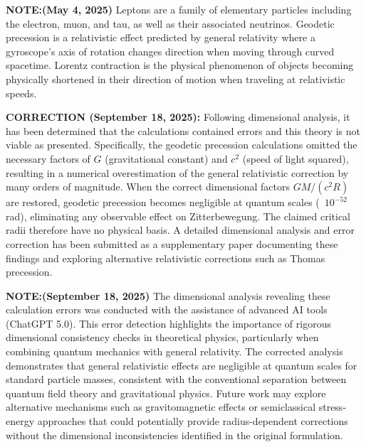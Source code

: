 \documentclass[12pt,letterpaper]{article} %
\begin{document}
\vspace{0.5cm}
\noindent\textbf{NOTE:(May 4, 2025)} Leptons are a family of elementary particles including the electron, muon, and tau, as well as their associated neutrinos. Geodetic precession is a relativistic effect predicted by general relativity where a gyroscope's axis of rotation changes direction when moving through curved spacetime. Lorentz contraction is the physical phenomenon of objects becoming physically shortened in their direction of motion when traveling at relativistic speeds.

\vspace{0.5cm}
\noindent\textbf{CORRECTION (September 18, 2025):} Following dimensional analysis, it has been determined that the calculations contained errors and this theory is not viable as presented. Specifically, the geodetic precession calculations omitted the necessary factors of $G$ (gravitational constant) and $c^2$ (speed of light squared), resulting in a numerical overestimation of the general relativistic correction by many orders of magnitude. When the correct dimensional factors $GM/(c^2R)$ are restored, geodetic precession becomes negligible at quantum scales (~$10^{-52}$ rad), eliminating any observable effect on Zitterbewegung. The claimed critical radii therefore have no physical basis. A detailed dimensional analysis and error correction has been submitted as a supplementary paper documenting these findings and exploring alternative relativistic corrections such as Thomas precession.

\vspace{0.3cm}
\noindent\textbf{NOTE:(September 18, 2025)} The dimensional analysis revealing these calculation errors was conducted with the assistance of advanced AI tools (ChatGPT 5.0). This error detection highlights the importance of rigorous dimensional consistency checks in theoretical physics, particularly when combining quantum mechanics with general relativity. The corrected analysis demonstrates that general relativistic effects are negligible at quantum scales for standard particle masses, consistent with the conventional separation between quantum field theory and gravitational physics. Future work may explore alternative mechanisms such as gravitomagnetic effects or semiclassical stress-energy approaches that could potentially provide radius-dependent corrections without the dimensional inconsistencies identified in the original formulation.

\end{document}
